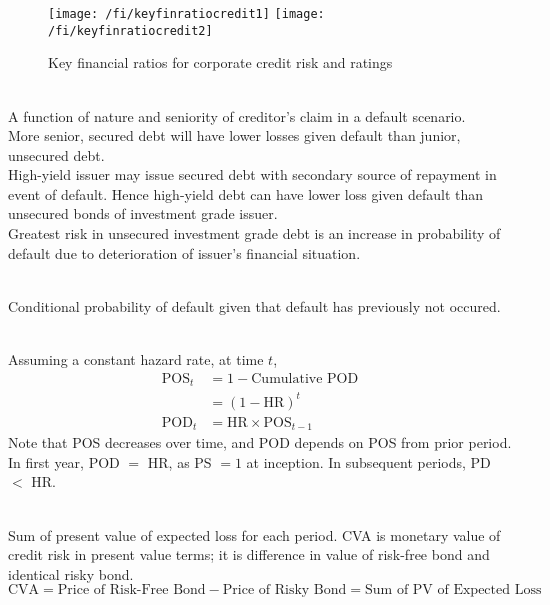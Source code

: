 \begin{figure}[H]
\centering
\texttt{[image: /fi/keyfinratiocredit1]}
\texttt{[image: /fi/keyfinratiocredit2]}
\caption{Key financial ratios for corporate credit risk and ratings}
\end{figure}

\begin{remark} \\
A function of nature and seniority of creditor's claim in a default scenario.\\
More senior, secured debt will have lower losses given default than junior, unsecured debt.\\
High-yield issuer may issue secured debt with secondary source of repayment in event of default. Hence high-yield debt can have lower loss given default than unsecured bonds of investment grade issuer.\\
Greatest risk in unsecured investment grade debt is an increase in probability of default due to deterioration of issuer's financial situation.
\end{remark}

\begin{definition} \\
Conditional probability of default given that default has previously not occured.
\end{definition}

\begin{definition} \\
Assuming a constant hazard rate, at time $t$, 
\begin{align}
\text{POS}_t &= 1 - \text{Cumulative POD} \nonumber \\
&= (1-\text{HR})^t \nonumber \\
\text{POD}_t &= \text{HR} \times \text{POS}_{t-1} \nonumber
\end{align}
Note that POS decreases over time, and POD depends on POS from prior period.\\
In first year, POD $=$ HR, as PS $=1$ at inception. In subsequent periods, PD $<$ HR.
\end{definition}

\begin{definition} \\
Sum of present value of expected loss for each period. CVA is monetary value of credit risk in present value terms; it is difference in value of risk-free bond and identical risky bond.
\begin{equation}
\text{CVA} = \text{Price of Risk-Free Bond} - \text{Price of Risky Bond} = \text{Sum of PV of Expected Loss}\nonumber
\end{equation}
\end{definition}

